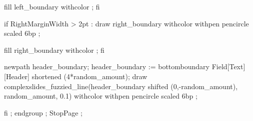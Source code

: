        fill left_boundary withcolor  ;
     fi

     if RightMarginWidth > 2pt :
        draw right_boundary
           withcolor 
           withpen pencircle scaled 6bp ;

       fill right_boundary withcolor  ;
     fi

     newpath header_boundary;
     header_boundary := bottomboundary Field[Text][Header] shortened (4*random_amount);
     draw complexslides_fuzzied_line(header_boundary shifted (0,-random_amount),
                                     random_amount, 0.1)
           withcolor 
           withpen pencircle scaled 6bp ;

  fi ;
  endgroup ;
  StopPage ;
\stopuseMPgraphic


\setupbackgrounds[\v!page][\c!background={complexslides:pagebackground}]


\protect

\stopmodule
